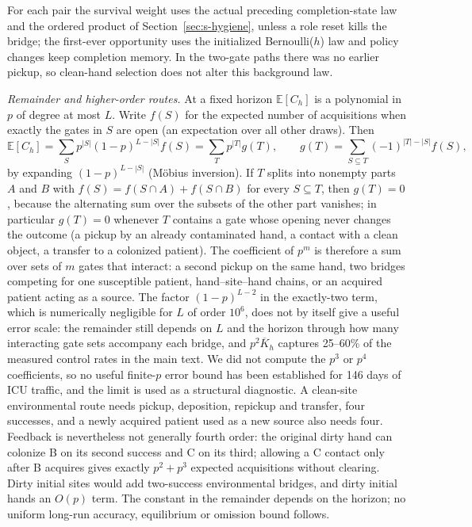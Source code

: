 \documentclass[11pt]{article}
\newcommand{\E}{\mathbb E}
\begin{document}
For each pair the survival weight uses the actual preceding completion-state law
and the ordered product of Section~\ref{sec:s-hygiene}, unless a role reset kills
the bridge; the first-ever opportunity uses the initialized Bernoulli($h$) law and
policy changes keep completion memory. In the two-gate paths there was no earlier
pickup, so clean-hand selection does not alter this background law.

\emph{Remainder and higher-order routes.} At a fixed horizon $\E[C_h]$ is a
polynomial in $p$ of degree at most $L$. Write $f(S)$ for the expected number of
acquisitions when exactly the gates in $S$ are open (an expectation over all other
draws). Then
\[
\E[C_h]=\sum_S p^{|S|}(1-p)^{L-|S|}f(S)=\sum_T p^{|T|}g(T),\qquad
g(T)=\sum_{S\subseteq T}(-1)^{|T|-|S|}f(S),
\]
by expanding $(1-p)^{L-|S|}$ (M\"obius inversion). If $T$ splits into nonempty
parts $A$ and $B$ with $f(S)=f(S\cap A)+f(S\cap B)$ for every $S\subseteq T$, then
$g(T)=0$, because the alternating sum over the subsets of the other part vanishes;
in particular $g(T)=0$ whenever $T$ contains a gate whose opening never changes the
outcome (a pickup by an already contaminated hand, a contact with a clean object,
a transfer to a colonized patient). The coefficient of $p^m$ is therefore a sum
over sets of $m$ gates that interact: a second pickup on the same hand, two
bridges competing for one susceptible patient, hand--site--hand chains, or an
acquired patient acting as a source. The factor $(1-p)^{L-2}$ in the exactly-two
term, which is numerically negligible for $L$ of order $10^6$, does not by itself give a useful
error scale: the remainder still depends on $L$ and the horizon through how many interacting gate sets
accompany each bridge, and $p^2\overline K_h$ captures 25--60\% of the measured
control rates in the main text. We did not compute the $p^3$ or $p^4$
coefficients, so no useful finite-$p$ error bound has been established for 146
days of ICU traffic, and the limit is used as a structural diagnostic. A
clean-site environmental route needs pickup, deposition, repickup and transfer,
four successes, and a newly acquired patient used as a new source also needs
four. Feedback is nevertheless not generally fourth order: the original
dirty hand can colonize B on its second success and C on its third; allowing a C
contact only after B acquires gives exactly $p^2+p^3$ expected acquisitions
without clearing. Dirty initial sites would add two-success environmental
bridges, and dirty initial hands an $O(p)$ term. The constant in the remainder
depends on the horizon; no uniform long-run accuracy, equilibrium or omission
bound follows.
\end{document}
